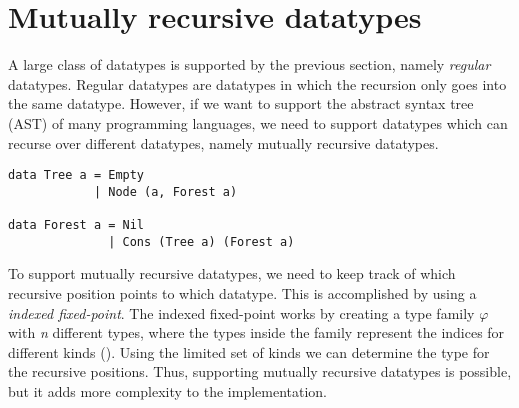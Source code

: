 \section{Mutually recursive datatypes}
A large class of datatypes is supported by the previous section, namely \textit{regular} datatypes. Regular datatypes are datatypes in which the recursion only goes into the same datatype. However, if we want to support the abstract syntax tree (AST) of many programming languages, we need to support datatypes which can recurse over different datatypes, namely mutually recursive datatypes.

\begin{verbatim}
data Tree a = Empty 
            | Node (a, Forest a)

data Forest a = Nil
              | Cons (Tree a) (Forest a)
\end{verbatim}

To support mutually recursive datatypes, we need to keep track of which recursive position points to which datatype. This is accomplished by using a \textit{indexed fixed-point}\cite{yakushev2009generic}. The indexed fixed-point works by creating a type family $\varphi$ with \textit{n} different types, where the types inside the family represent the indices for different kinds (\inlinehaskell{*!$_{\varphi}$!}). Using the limited set of kinds we can determine the type for the recursive positions. Thus, supporting mutually recursive datatypes is possible, but it adds more complexity to the implementation.   